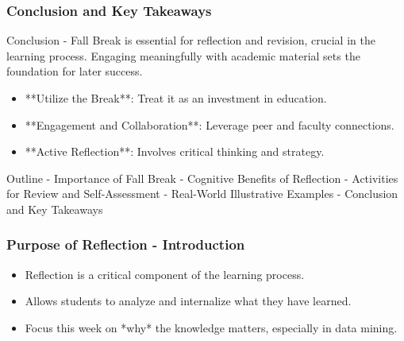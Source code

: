 \documentclass[aspectratio=169]{beamer}
\begin{document}
\begin{frame}[fragile]
    \frametitle{Conclusion and Key Takeaways}
    
    \begin{block}{Conclusion}
        - Fall Break is essential for reflection and revision, crucial in the learning process. Engaging meaningfully with academic material sets the foundation for later success.
    \end{block}
    
    \begin{itemize}
        \item **Utilize the Break**: Treat it as an investment in education.
        \item **Engagement and Collaboration**: Leverage peer and faculty connections.
        \item **Active Reflection**: Involves critical thinking and strategy.
    \end{itemize}
    
    \begin{block}{Outline}
        - Importance of Fall Break
        - Cognitive Benefits of Reflection
        - Activities for Review and Self-Assessment
        - Real-World Illustrative Examples
        - Conclusion and Key Takeaways
    \end{block}
\end{frame}

\begin{frame}[fragile]
    \frametitle{Purpose of Reflection - Introduction}
    \begin{itemize}
        \item Reflection is a critical component of the learning process.
        \item Allows students to analyze and internalize what they have learned.
        \item Focus this week on *why* the knowledge matters, especially in data mining.
    \end{itemize}
\end{frame}
\end{document}
